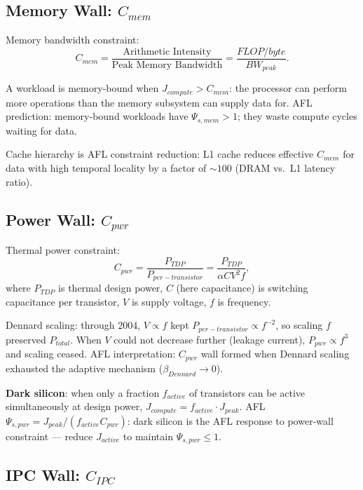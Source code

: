 \documentclass[11pt]{article}
\begin{document}
\subsection{Memory Wall: $C_{mem}$}

Memory bandwidth constraint:
\begin{equation}
C_{mem} = \frac{\text{Arithmetic Intensity}}{\text{Peak Memory Bandwidth}} = \frac{FLOP/byte}{BW_{peak}}.
\end{equation}

A workload is memory-bound when $J_{compute} > C_{mem}$: the processor can perform more
operations than the memory subsystem can supply data for. AFL prediction: memory-bound
workloads have $\Psi_{s,mem} > 1$; they waste compute cycles waiting for data.

Cache hierarchy is AFL constraint reduction: L1 cache reduces effective $C_{mem}$ for data
with high temporal locality by a factor of $\sim100$ (DRAM vs.\ L1 latency ratio).

\subsection{Power Wall: $C_{pwr}$}

Thermal power constraint:
\begin{equation}
C_{pwr} = \frac{P_{TDP}}{P_{per-transistor}} = \frac{P_{TDP}}{\alpha CV^2 f},
\end{equation}
where $P_{TDP}$ is thermal design power, $C$ (here capacitance) is switching capacitance per
transistor, $V$ is supply voltage, $f$ is frequency.

Dennard scaling: through 2004, $V \propto f$ kept $P_{per-transistor} \propto f^{-2}$, so
scaling $f$ preserved $P_{total}$. When $V$ could not decrease further (leakage current), $P_{pwr}
\propto f^3$ and scaling ceased. AFL interpretation: $C_{pwr}$ wall formed when Dennard scaling
exhausted the adaptive mechanism ($\beta_{Dennard} \to 0$).

\textbf{Dark silicon}: when only a fraction $f_{active}$ of transistors can be active simultaneously
at design power, $J_{compute} = f_{active} \cdot J_{peak}$. AFL $\Psi_{s,pwr} = J_{peak}/(f_{active}
C_{pwr})$: dark silicon is the AFL response to power-wall constraint --- reduce $J_{active}$
to maintain $\Psi_{s,pwr} \leq 1$.

\subsection{IPC Wall: $C_{IPC}$}
\end{document}
